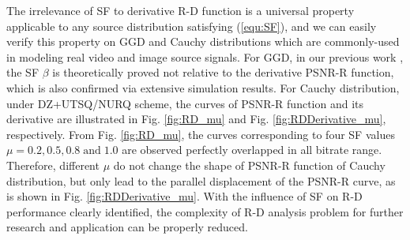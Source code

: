 \documentclass[smallabstract,smallcaptions]{dccpaper}
\begin{document}
The irrelevance of SF to derivative R-D function is a universal property applicable to any source distribution satisfying (\ref{equ:SF}), and we can easily verify this property on GGD and Cauchy distributions which are commonly-used in modeling real video and image source signals. For GGD, in our previous work \cite{Sun_TIP2013}, the SF $\beta$ is theoretically proved not relative to the derivative PSNR-R function, which is also confirmed via extensive simulation results. For Cauchy distribution, under DZ+UTSQ/NURQ scheme, the curves of PSNR-R function and its derivative are illustrated in Fig. \ref{fig:RD_mu} and Fig. \ref{fig:RDDerivative_mu}, respectively. From Fig. \ref{fig:RD_mu}, the curves corresponding to four SF values $\mu = 0.2, 0.5, 0.8 \; \textrm{and} \; 1.0$ are observed perfectly overlapped in all bitrate range. Therefore, different $\mu$ do not change the shape of PSNR-R function of Cauchy distribution, but only lead to the parallel displacement of the PSNR-R curve, as is shown in Fig. \ref{fig:RDDerivative_mu}. With the influence of SF on R-D performance clearly identified, the complexity of R-D analysis problem for further research and application can be properly reduced. 

\end{document}
